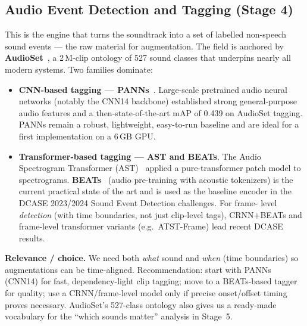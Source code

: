 \documentclass[11pt,a4paper]{article}
\begin{document}
\subsection{Audio Event Detection and Tagging (Stage 4)}
This is the engine that turns the soundtrack into a set of labelled non-speech sound events ---
the raw material for augmentation. The field is anchored by \textbf{AudioSet}~\cite{audioset}, a
2\,M-clip ontology of 527 sound classes that underpins nearly all modern systems. Two families
dominate:
\begin{itemize}
  \item \textbf{CNN-based tagging --- PANNs}~\cite{panns}. Large-scale pretrained audio neural
    networks (notably the CNN14 backbone) established strong general-purpose audio features and a
    then-state-of-the-art mAP of 0.439 on AudioSet tagging. PANNs remain a robust, lightweight,
    easy-to-run baseline and are ideal for a first implementation on a 6\,GB GPU.
  \item \textbf{Transformer-based tagging --- AST and BEATs}. The Audio Spectrogram Transformer
    (AST)~\cite{ast} applied a pure-transformer patch model to spectrograms. \textbf{BEATs}~\cite{beats}
    (audio pre-training with acoustic tokenizers) is the current practical state of the art and is
    used as the baseline encoder in the DCASE 2023/2024 Sound Event Detection challenges. For frame-
    level \emph{detection} (with time boundaries, not just clip-level tags), CRNN+BEATs and
    frame-level transformer variants (e.g.\ ATST-Frame) lead recent DCASE results.
\end{itemize}
\textbf{Relevance / choice.} We need both \emph{what} sound and \emph{when} (time boundaries) so
augmentations can be time-aligned. Recommendation: start with PANNs (CNN14) for fast, dependency-light
clip tagging; move to a BEATs-based tagger for quality; use a CRNN/frame-level model only if precise
onset/offset timing proves necessary. AudioSet's 527-class ontology also gives us a ready-made
vocabulary for the ``which sounds matter'' analysis in Stage~5.

\end{document}
